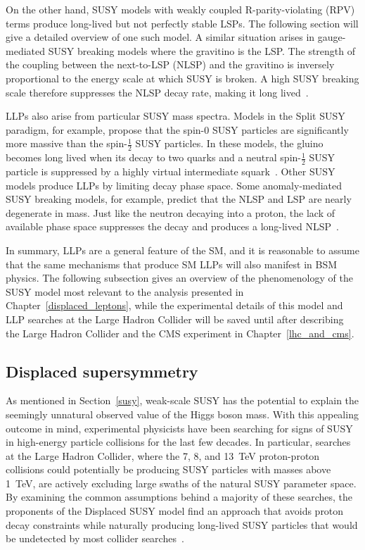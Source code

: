 On the other hand, SUSY models with weakly coupled R-parity-violating (RPV) terms produce long-lived but not perfectly stable LSPs. The following section will give a detailed overview of one such model. A similar situation arises in gauge-mediated SUSY breaking models where the gravitino is the LSP. The strength of the coupling between the next-to-LSP (NLSP) and the gravitino is inversely proportional to the energy scale at which SUSY is broken. A high SUSY breaking scale therefore suppresses the NLSP decay rate, making it long lived~\cite{liu_2015}.

LLPs also arise from particular SUSY mass spectra. Models in the Split SUSY paradigm, for example, propose that the spin-0 SUSY particles are significantly more massive than the spin-$\frac{1}{2}$ SUSY particles. In these models, the gluino becomes long lived when its decay to two quarks and a neutral spin-$\frac{1}{2}$ SUSY particle is suppressed by a highly virtual intermediate squark~\cite{split_susy_colliders}. Other SUSY models produce LLPs by limiting decay phase space. Some anomaly-mediated SUSY breaking models, for example, predict that the NLSP and LSP are nearly degenerate in mass. Just like the neutron decaying into a proton, the lack of available phase space suppresses the decay and produces a long-lived NLSP~\cite{amsb_at_lhc}.

In summary, LLPs are a general feature of the SM, and it is reasonable to assume that the same mechanisms that produce SM LLPs will also manifest in BSM physics. The following subsection gives an overview of the phenomenology of the SUSY model most relevant to the analysis presented in Chapter~\ref{displaced_leptons}, while the experimental details of this model and LLP searches at the Large Hadron Collider will be saved until after describing the Large Hadron Collider and the CMS experiment in Chapter~\ref{lhc_and_cms}.

\subsection{Displaced supersymmetry}
\label{displaced_susy}
As mentioned in Section~\ref{susy}, weak-scale SUSY has the potential to explain the seemingly unnatural observed value of the Higgs boson mass. With this appealing outcome in mind, experimental physicists have been searching for signs of SUSY in high-energy particle collisions for the last few decades. In particular, searches at the Large Hadron Collider, where the \num{7}, \num{8}, and \SI{13}{\TeV} proton-proton collisions could potentially be producing SUSY particles with masses above \SI{1}{\TeV}, are actively excluding large swaths of the natural SUSY parameter space. By examining the common assumptions behind a majority of these searches, the proponents of the Displaced SUSY model find an approach that avoids proton decay constraints while naturally producing long-lived SUSY particles that would be undetected by most collider searches~\cite{displaced_susy}.


